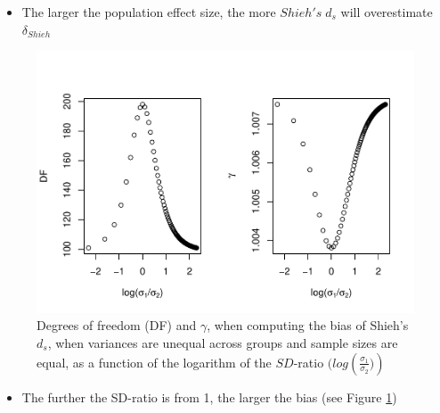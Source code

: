 \documentclass[
  man]{apa6}
\providecommand{\tightlist}{%
  \setlength{\itemsep}{0pt}\setlength{\parskip}{0pt}}
\begin{document}
\begin{itemize}
\tightlist
\item
  The larger the population effect size, the more \(Shieh's \; d_s\) will overestimate \(\delta_{Shieh}\)
\end{itemize}

\begin{figure}
\centering
\includegraphics{Theoretical-Bias-of-all-estimators-as-a-function-of-population-parameters_files/figure-latex/biasshiehhetbalSDratio2-1.pdf}
\caption{\label{fig:biasshiehhetbalSDratio2}Degrees of freedom (DF) and \(\gamma\), when computing the bias of Shieh's \(d_s\), when variances are unequal across groups and sample sizes are equal, as a function of the logarithm of the \(SD\)-ratio \((log \left(\frac{\sigma_1}{\sigma_2})\right)\)}
\end{figure}

\begin{itemize}
\tightlist
\item
  The further the SD-ratio is from 1, the larger the bias (see Figure \ref{fig:biasshiehhetbalSDratio2})
\end{itemize}
\end{document}
